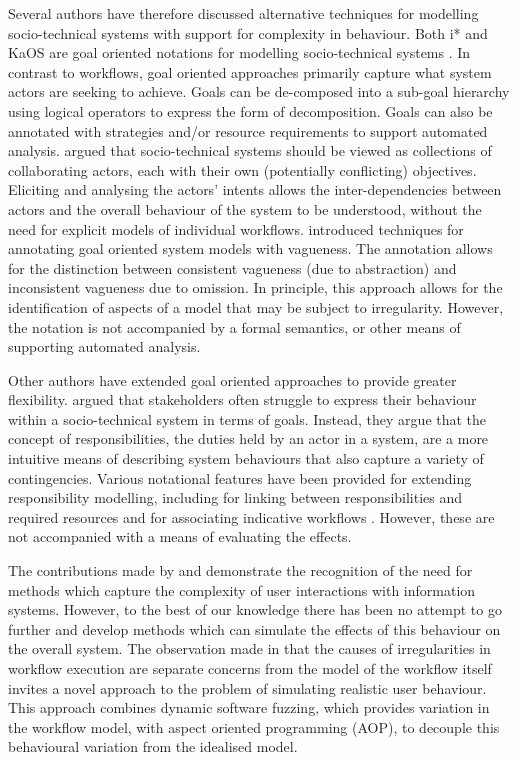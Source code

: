 \documentclass{llncs}
\begin{document}
Several authors have therefore discussed alternative techniques for modelling socio-technical systems with
support for complexity in behaviour.  Both i* \citep{yu1995social} and KaOS \citep{dardenne93goal} are goal oriented notations for modelling socio-technical
systems \cite{werneck2009goreistarkaos}.  In contrast to workflows, goal oriented approaches primarily capture what
system actors are seeking to achieve.  Goals can be de-composed into a sub-goal hierarchy using logical operators to
express the form of decomposition. Goals can also be annotated with strategies and/or resource requirements to support
automated analysis.  \citet{yu1995social} argued that socio-technical systems should be viewed as collections of
collaborating actors, each with their own (potentially conflicting) objectives.  Eliciting and analysing the actors'
intents allows the inter-dependencies between actors and the overall behaviour of the system to be understood, without
the need for explicit models of individual workflows. \citet{herrmann1999vagueness} introduced techniques for annotating
goal oriented system models with vagueness.  The annotation allows for the distinction between consistent vagueness (due
to abstraction) and inconsistent vagueness due to omission.  In principle, this approach allows for the identification
of aspects of a model that may be subject to irregularity.  However, the notation is not accompanied by a formal
semantics, or other means of supporting automated analysis.

Other authors have extended goal oriented approaches to provide greater flexibility. \citet{sommerville09deriving}
argued that stakeholders often struggle to express their behaviour within a socio-technical system in terms of goals.
Instead, they argue that the concept of responsibilities, the duties held by an actor in a system, are a more intuitive
means of describing system behaviours that also capture a variety of contingencies.  Various notational features have
been provided for extending responsibility modelling, including for linking between responsibilities and required
resources and for associating indicative workflows \citep{dewsbury07responsibility}.  However, these are not accompanied
with a means of evaluating the effects.

The contributions made by \citet{herrmann1999vagueness} and \citet{sommerville09deriving} demonstrate the recognition of
the need for methods which capture the complexity of user interactions with information systems.  However, to the best
of our knowledge there has been no attempt to go further and develop methods which can simulate the effects of this
behaviour on the overall system. The observation made in  that the causes of irregularities in
workflow execution are separate concerns from the model of the workflow itself invites a novel approach to the problem
of simulating realistic user behaviour. This approach combines dynamic software fuzzing, which provides variation in the
workflow model, with aspect oriented programming (AOP), to decouple this behavioural variation from the idealised model.
\end{document}
